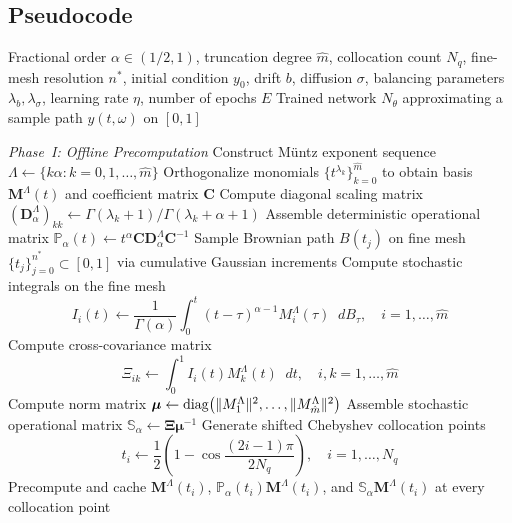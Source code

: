 \documentclass[11pt, a4paper]{article}
\theoremstyle{theoremstyle}
\theoremstyle{definitionstyle}
\newcommand{\dd}{\mathop{}\!d}
\DeclarePairedDelimiter{\norm}{\lVert}{\rVert}
\begin{document}
\begin{appendices}
    \section{Pseudocode} \label{alg:mldnn}
    
    \begin{algorithm}[H]
    \caption{M\"untz-Legendre Neural Network Solver for Caputo SDEs}
    \begin{algorithmic}[1]
    \Require Fractional order $\alpha \in (1/2, 1)$, truncation degree $\hat{m}$, collocation count $N_q$, fine-mesh resolution $n^*$, initial condition $y_0$, drift $b$, diffusion $\sigma$, balancing parameters $\lambda_b, \lambda_\sigma$, learning rate $\eta$, number of epochs $E$
    \Ensure Trained network $N_\theta$ approximating a sample path $y(t, \omega)$ on $[0,1]$
    
    \Statex \textit{Phase~I: Offline Precomputation}
    \State Construct M\"untz exponent sequence $\Lambda \gets \{k\alpha : k = 0, 1, \dots, \hat{m}\}$
    \State Orthogonalize monomials $\{t^{\lambda_k}\}_{k=0}^{\hat{m}}$ to obtain basis $\mathbf{M}^\Lambda(t)$ and coefficient matrix $\mathbf{C}$
    \State Compute diagonal scaling matrix $(\mathbf{D}^\Lambda_\alpha)_{kk} \gets \Gamma(\lambda_k + 1) / \Gamma(\lambda_k + \alpha + 1)$
    \State Assemble deterministic operational matrix $\mathbb{P}_\alpha(t) \gets t^\alpha \mathbf{C} \mathbf{D}^\Lambda_\alpha \mathbf{C}^{-1}$
    \State Sample Brownian path $B(t_j)$ on fine mesh $\{t_j\}_{j=0}^{n^*} \subset [0,1]$ via cumulative Gaussian increments
    \State Compute stochastic integrals on the fine mesh
        \begin{equation} I_i(t) \gets \frac{1}{\Gamma(\alpha)} \int_0^t (t-\tau)^{\alpha-1} M_i^\Lambda(\tau) \dd{B_\tau}, \quad i = 1, \dots, \hat{m} \end{equation}
    \State Compute cross-covariance matrix 
        \begin{equation}\Xi_{ik} \gets \int_0^1 I_i(t) M_k^\Lambda(t)\dd{t}, \quad i, k = 1, \dots, \hat{m} \end{equation}
    \State Compute norm matrix $\boldsymbol \mu \gets \mathrm{diag}\!\left(\norm{M_1^\Lambda}^2, \dots, \norm{M_{\hat{m}}^\Lambda}^2\right)$
    \State Assemble stochastic operational matrix $\mathbb{S}_\alpha \gets \mathbf{\Xi} \boldsymbol \mu^{-1}$
    \State Generate shifted Chebyshev collocation points
        \begin{equation} t_i \gets \frac{1}{2}\left (1 - \cos \frac{(2i-1)\pi}{2N_q}\right ), \quad i = 1, \dots, N_q \end{equation}
    \State Precompute and cache $\mathbf{M}^\Lambda(t_i)$, $\mathbb{P}_\alpha(t_i)\mathbf{M}^\Lambda(t_i)$, and $\mathbb{S}_\alpha\mathbf{M}^\Lambda(t_i)$ at every collocation point
    

\end{algorithmic}
\end{algorithm}
\end{appendices}
\end{document}
